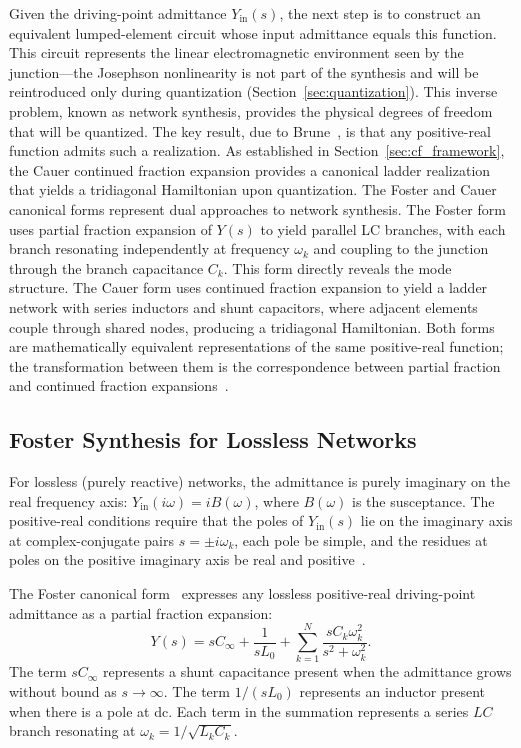 \documentclass[reprint, floatfix, superscriptaddress, amsmath, amssymb, longbibliography]{revtex4-2}
\begin{document}
Given the driving-point admittance $Y_{\mathrm{in}}(s)$, the next step is to construct an equivalent lumped-element circuit whose input admittance equals this function. This circuit represents the linear electromagnetic environment seen by the junction---the Josephson nonlinearity is not part of the synthesis and will be reintroduced only during quantization (Section~\ref{sec:quantization}). This inverse problem, known as network synthesis, provides the physical degrees of freedom that will be quantized. The key result, due to Brune~\cite{Brune1931}, is that any positive-real function admits such a realization. As established in Section~\ref{sec:cf_framework}, the Cauer continued fraction expansion provides a canonical ladder realization that yields a tridiagonal Hamiltonian upon quantization. The Foster and Cauer canonical forms represent dual approaches to network synthesis. The Foster form uses partial fraction expansion of $Y(s)$ to yield parallel LC branches, with each branch resonating independently at frequency $\omega_k$ and coupling to the junction through the branch capacitance $C_k$. This form directly reveals the mode structure. The Cauer form uses continued fraction expansion to yield a ladder network with series inductors and shunt capacitors, where adjacent elements couple through shared nodes, producing a tridiagonal Hamiltonian. Both forms are mathematically equivalent representations of the same positive-real function; the transformation between them is the correspondence between partial fraction and continued fraction expansions~\cite{Guillemin1957}.

\subsection{Foster Synthesis for Lossless Networks}
\label{sec:foster_synthesis}

For lossless (purely reactive) networks, the admittance is purely imaginary on the real frequency axis: $Y_{\mathrm{in}}(i\omega) = iB(\omega)$, where $B(\omega)$ is the susceptance. The positive-real conditions require that the poles of $Y_{\mathrm{in}}(s)$ lie on the imaginary axis at complex-conjugate pairs $s = \pm i\omega_k$, each pole be simple, and the residues at poles on the positive imaginary axis be real and positive~\cite{Guillemin1957}.

The Foster canonical form~\cite{Foster1924} expresses any lossless positive-real driving-point admittance as a partial fraction expansion:
\begin{equation}
Y(s) = sC_\infty + \frac{1}{sL_0} + \sum_{k=1}^{N} \frac{sC_k \omega_k^2}{s^2 + \omega_k^2}.
\label{eq:foster_form}
\end{equation}
The term $sC_\infty$ represents a shunt capacitance present when the admittance grows without bound as $s \to \infty$. The term $1/(sL_0)$ represents an inductor present when there is a pole at dc. Each term in the summation represents a series $LC$ branch resonating at $\omega_k = 1/\sqrt{L_k C_k}$.
\end{document}
